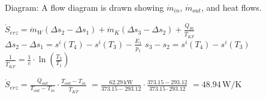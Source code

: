 Diagram: A flow diagram is drawn showing \( \dot{m}_{in} \), \( \dot{m}_{out} \), and heat flows.  

\( \dot{S}_{erz} = \dot{m}_W (\Delta s_2 - \Delta s_1) + \dot{m}_K (\Delta s_3 - \Delta s_2) + \frac{\dot{Q}_{26}}{\overline{T}_{KF}} \)  
\( \Delta s_2 - \Delta s_1 = s^i(T_4) - s^i(T_3) - \frac{E_1}{p_1} \)  
\( s_3 - s_2 = s^i(T_4) - s^i(T_3) \)  
\( \frac{1}{\overline{T}_{KF}} = \frac{1}{c} \cdot \ln \left( \frac{T_3}{T_1} \right) \)  

\( \dot{S}_{erz} = \frac{\dot{Q}_{out}}{T_{out} - T_{in}} \cdot \frac{T_{out} - T_{in}}{\overline{T}_{KF}} \)  
\( = \frac{62.29 \, \text{kW}}{373.15 - 293.12} \cdot \frac{373.15 - 293.12}{373.15 \cdot 293.12} \)  
\( = 48.94 \, \text{W/K} \)
